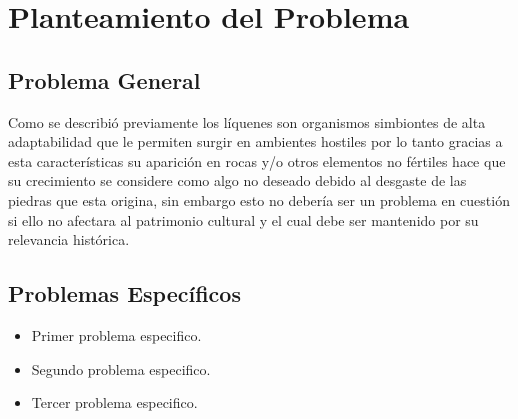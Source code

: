\chapter{Planteamiento del Problema}


\section{Problema General}
Como se describió previamente los líquenes son organismos simbiontes de alta adaptabilidad que le permiten surgir en ambientes hostiles por lo tanto gracias a esta características su aparición en rocas y/o otros elementos no fértiles hace que su crecimiento se considere como algo no deseado debido al desgaste de las piedras que esta origina, sin embargo esto no debería ser un problema en cuestión si ello no afectara al patrimonio cultural y el cual debe ser mantenido por su relevancia histórica.


\section{Problemas Específicos}

\begin{itemize}
	\item Primer problema especifico.
	\item Segundo problema especifico.
	\item Tercer problema especifico.	
\end{itemize}
